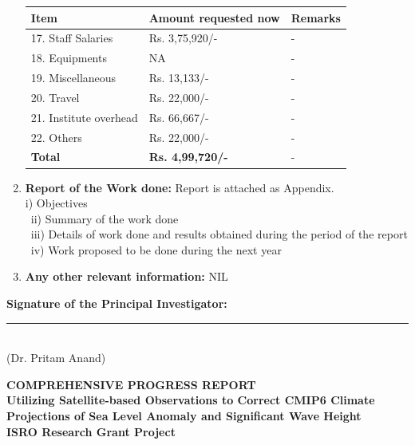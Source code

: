 \documentclass[11pt,a4paper]{article}
\begin{document}
\begin{enumerate}[label=\textbf{\arabic*.}]
    \begin{table}[H]
        \centering
        \begin{tabular}{|p{}|p{}|p{}|}
            \hline
            \textbf{Item} & \textbf{Amount requested now} & \textbf{Remarks} \\
            \hline
            17. Staff Salaries & Rs. 3,75,920/- & - \\
            18. Equipments & NA & - \\
            19. Miscellaneous & Rs. 13,133/- & - \\
            20. Travel & Rs. 22,000/- & - \\
            21. Institute overhead & Rs. 66,667/- & - \\
            22. Others & Rs. 22,000/- & - \\
            \hline
            \textbf{Total} & \textbf{Rs. 4,99,720/-} & - \\
            \hline
        \end{tabular}
    \end{table}

    \item \textbf{Report of the Work done:} Report is attached as Appendix.
    \\[0.25em]
    i) Objectives \\
    \textbullet\ ii) Summary of the work done \\
    \textbullet\ iii) Details of work done and results obtained during the period of the report \\
    \textbullet\ iv) Work proposed to be done during the next year

    \item \textbf{Any other relevant information:} NIL
\end{enumerate}

\vspace{3em}
\noindent \textbf{Signature of the Principal Investigator:} \\[2em]
\noindent \rule{6cm}{0.4pt} \\
(Dr. Pritam Anand)

\newpage
\appendix
\begin{center}
    \textbf{\LARGE COMPREHENSIVE PROGRESS REPORT} \\[1em]
    \textbf{\large Utilizing Satellite-based Observations to Correct CMIP6 Climate Projections of Sea Level Anomaly and Significant Wave Height} \\[1em]
    \textbf{ISRO Research Grant Project}
\end{center}
\end{document}
